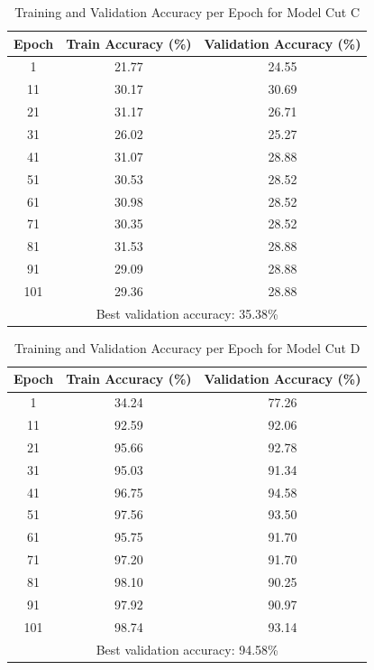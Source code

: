 \documentclass[11pt]{scrartcl}
\begin{document}
\begin{table}[htbp]
\centering
\caption{Training and Validation Accuracy per Epoch for Model Cut C}
\begin{tabular}{ccc}
\toprule
\textbf{Epoch} & \textbf{Train Accuracy (\%)} & \textbf{Validation Accuracy (\%)} \\
\midrule
1    & 21.77 & 24.55 \\
11   & 30.17 & 30.69 \\
21   & 31.17 & 26.71 \\
31   & 26.02 & 25.27 \\
41   & 31.07 & 28.88 \\
51   & 30.53 & 28.52 \\
61   & 30.98 & 28.52 \\
71   & 30.35 & 28.52 \\
81   & 31.53 & 28.88 \\
91   & 29.09 & 28.88 \\
101  & 29.36 & 28.88 \\
\midrule
\multicolumn{3}{c}{Best validation accuracy: 35.38\%} \\
\bottomrule
\end{tabular}
\label{tab:task3-bonus-cutc-accuracy}
\end{table}

\begin{table}[htbp]
\centering
\caption{Training and Validation Accuracy per Epoch for Model Cut D}
\begin{tabular}{ccc}
\toprule
\textbf{Epoch} & \textbf{Train Accuracy (\%)} & \textbf{Validation Accuracy (\%)} \\
\midrule
1    & 34.24 & 77.26 \\
11   & 92.59 & 92.06 \\
21   & 95.66 & 92.78 \\
31   & 95.03 & 91.34 \\
41   & 96.75 & 94.58 \\
51   & 97.56 & 93.50 \\
61   & 95.75 & 91.70 \\
71   & 97.20 & 91.70 \\
81   & 98.10 & 90.25 \\
91   & 97.92 & 90.97 \\
101  & 98.74 & 93.14 \\
\midrule
\multicolumn{3}{c}{Best validation accuracy: 94.58\%} \\
\bottomrule
\end{tabular}
\label{tab:task3-bonus-cutd-accuracy}
\end{table}
\end{document}
